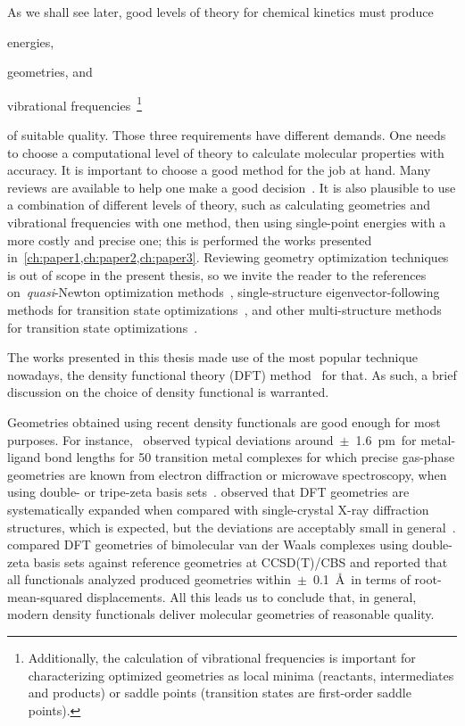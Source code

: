 As we shall see later,
good levels of theory for chemical kinetics
must produce
\begin{enumerate*}
	\item energies,
	\item geometries,
	      and
	\item vibrational frequencies~\footnote{Additionally,
		      the calculation of vibrational frequencies
		      is important for characterizing optimized geometries
		      as local minima (reactants,
		      intermediates and products)
		      or saddle points (transition states are first-order saddle points).}
\end{enumerate*}
of suitable quality.
Those three requirements have different demands.
One needs to choose a computational level of theory to calculate
molecular properties with accuracy.
It is important to choose a good method for the job at hand.
Many reviews are available to help one make a good decision~\cite{Goerigk_2011,Goerigk_2019,Mardirossian_2017,Morgante_2020,Bursch_2022}.
It is also plausible to use a combination of different levels of theory,
such as calculating geometries and vibrational frequencies with one method,
then using single-point energies with a more costly and precise one;
this is performed the works presented in~\cref{ch:paper1,ch:paper2,ch:paper3}.
Reviewing geometry optimization techniques is out of scope in the present
thesis,
so we invite the reader to the references
on~\emph{quasi}-Newton optimization methods~\cite{Banerjee_1985,Schlegel_1987},
single-structure eigenvector-following methods for transition state optimizations~\cite{Banerjee_1985,Schlegel_1987,Mauro_2005},
and other multi-structure methods
for transition state optimizations~\cite{Peng_1993,Peng_1996,Henkelman_2000a,Henkelman_2000b,Henkelman_2002,Sheppard_2008,Zimmerman_2013a,Zimmerman_2013b,Zimmerman_2015,Jafari_2017}.

The works presented in this thesis made use of the most popular technique nowadays,
the density functional theory (DFT)
method~\cite{Hohenberg_1964,Kohn_1965,Perdew_2014,Kryachko_2014,Yu_2016} for
that.
As such,
a brief discussion on the choice of density functional is warranted.

Geometries obtained using recent density functionals are good enough
for most purposes.
For instance,~\citeauthor{Bühl_2006} observed typical deviations around~$\pm$~1.6~pm~for
metal-ligand bond lengths for 50 transition metal complexes for which precise gas-phase geometries
are known from electron diffraction or microwave spectroscopy,
when using double- or tripe-zeta basis sets~\cite{Bühl_2006}.
\citeauthor{Minenkov_2012} observed that
DFT geometries are systematically expanded when compared with single-crystal
X-ray diffraction structures,
which is expected,
but the deviations are
acceptably small in general~\cite{Minenkov_2012}.
\citeauthor{Sirianni_2018} compared DFT geometries of bimolecular van der Waals complexes using
double-zeta basis sets against reference geometries at CCSD(T)/CBS
and reported that all functionals analyzed produced
geometries within~$\pm$~0.1~\AA{}~in terms
of root-mean-squared displacements.
All this leads us to conclude that,
in general,
modern density functionals deliver molecular geometries of reasonable quality.

